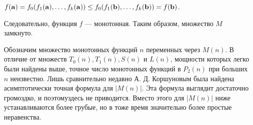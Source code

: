 \documentclass[10pt]{article}
\begin{document}
\begin{center} $f({\bf{a}})=f_0(f_1({\bf{a}}), \dots, f_k({\bf{a}})) \le f_0(f_1({\bf{b}}), \dots, f_k({\bf{b}})) = f({\bf{b}})$.\end{center}
Следовательно, функция $f$ — монотонная. Таким образом, множество $M$ замкнуто.\par
Обозначим множество монотонных функций $n$ переменных через $M(n)$. В отличие от множеств $T_0(n),
T_1(n), S(n)$ и $L(n)$, мощности которых легко были найдены выше, точное число монотонных
функций в $P_2(n)$ при больших $n$ неизвестно. Лишь сравнительно недавно А. Д. Коршуновым была
найдена асимптотически точная формула для $|M(n)|$. Эта формула выглядит достаточно громоздко,
и поэтомуздесь не приводится. Вместо этого
для $|M(n)|$ ниже устанавливаются более грубые, но в тоже время значительно более простые неравенства.
\end{document}
